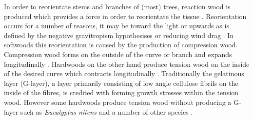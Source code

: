 In order to reorientate stems and branches of (most) trees, reaction wood is
produced which provides a force in order to reorientate the tissue \cite{gardiner2014biology}.
Reorientation occurs for a number of reasons, it may be toward the light or upwards as is defined by the
negative gravitropism hypothesises or reducing wind drag \cite{niklas2012plant}\cite{coutts1995wind}. In softwoods this
reorientation is caused by the production of compression wood. Compression wood
forms on the outside of the curve or branch and expands longitudinally \cite{timell1986compression}. Hardwoods
on the other hand produce tension wood on the inside of the desired curve which
contracts longitudinally \cite{gardiner2014biology}. Traditionally the
gelatinous layer (G-layer), a layer primarily consisting of low angle cellulose
fibrils on the inside of the fibres, is credited with forming growth stresses
within the tension wood. However some hardwoods produce tension wood
without producing a G-layer such as \textit{Eucalyptus nitens} \cite{Qiu_2008} and a number of other species \cite{Ruelle_2006}.
